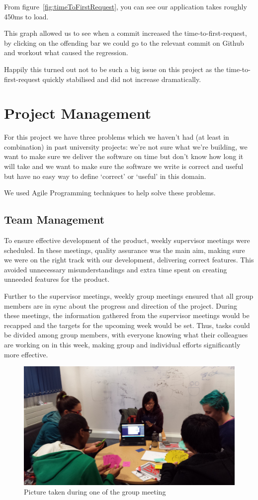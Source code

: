 \documentclass[11pt, a4paper]{article}
\begin{document}
From figure~\ref{fig:timeToFirstRequest}, you can see our application takes roughly 450ms to load.

This graph allowed us to see when a commit increased the time-to-first-request, by clicking on the offending bar we could go to the relevant commit on Github and workout what caused the regression.

Happily this turned out not to be such a big issue on this project as the time-to-first-request quickly stabilised and did not increase dramatically. 

\section{Project Management}
For this project we have three problems which we haven't had (at least in combination) in past university projects: we're not sure what we're building, we want to make sure we deliver the software on time but don't know how long it will take and
we want to make sure the software we write is correct and useful but have no easy way to define `correct' or `useful' in this domain.

We used Agile Programming techniques to help solve these problems.

\subsection{Team Management}

To ensure effective development of the product, weekly supervisor meetings were scheduled.
In these meetings, quality assurance was the main aim, making sure we were on the right track with our development, delivering correct features. 
This avoided unnecessary misunderstandings and extra time spent on creating unneeded features for the product. 

Further to the supervisor meetings, weekly group meetings ensured that all group members are in sync about the progress and direction of the project. 
During these meetings, the information gathered from the supervisor meetings would be recapped and the targets for the upcoming week would be set. 
Thus, tasks could be divided among group members, with everyone knowing what their colleagues are working on in this week, making group and individual efforts significantly more effective.
\begin{figure}[h!]
\centering
\includegraphics[width=130mm]{estimation.jpg}
\caption{Picture taken during one of the group meeting}
\end{figure}
\end{document}
